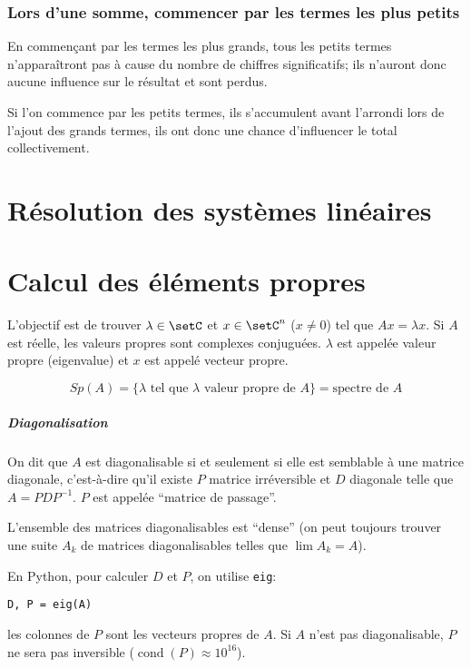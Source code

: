 \documentclass[a4paper,10pt,french,openany]{memoir}
\DeclareMathOperator{\cond}{cond}
\begin{document}
\subsection{Lors d'une somme, commencer par les termes les plus petits}

En commençant par les termes les plus grands, tous les petits termes n'apparaîtront pas à cause du nombre de chiffres significatifs; ils n'auront donc aucune influence sur le résultat et sont perdus.

Si l'on commence par les petits termes, ils s'accumulent avant l'arrondi lors de l'ajout des grands termes, ils ont donc une chance d'influencer le total collectivement.

\chapter{Résolution des systèmes linéaires}

\chapter{Calcul des éléments propres}

L'objectif est de trouver $\lambda \in \setC$ et $x \in \setC^n$ ($x \neq 0$) tel que $A x = \lambda x$. Si $A$ est réelle, les valeurs propres sont complexes conjuguées. $\lambda$ est appelée valeur propre (eigenvalue) et $x$ est appelé vecteur propre.

\[ Sp(A) = \lbrace \lambda \text{ tel que } \lambda \text{ valeur propre de } A \rbrace = \text{spectre de } A \]

\paragraph{Diagonalisation}
On dit que $A$ est diagonalisable si et seulement si elle est semblable à une matrice diagonale, c'est-à-dire qu'il existe $P$ matrice irréversible et $D$ diagonale telle que $A = P D P^{-1}$. $P$ est appelée ``matrice de passage''.

L'ensemble des matrices diagonalisables est ``dense'' (on peut toujours trouver une suite $A_k$ de matrices diagonalisables telles que $\lim A_k = A$).

En Python, pour calculer $D$ et $P$, on utilise \lstinline{eig}:
\begin{lstlisting}
D, P = eig(A)
\end{lstlisting}
les colonnes de $P$ sont les vecteurs propres de $A$. Si $A$ n'est pas diagonalisable, $P$ ne sera pas inversible ($\cond(P) \approx 10^{16}$).
\end{document}
